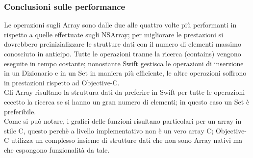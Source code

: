 \subsubsection{Conclusioni sulle performance}
Le operazioni sugli Array sono dalle due alle quattro volte più performanti in rispetto a quelle effettuate sugli NSArray; per migliorare le prestazioni si dovrebbero preinizializzare le strutture dati con il numero di elementi massimo conosciuto in anticipo. Tutte le operazioni tranne la ricerca (contains) vengono eseguite in tempo costante; nonostante Swift gestisca le operazioni di inserzione in un Dizionario e in un Set in maniera più efficiente, le altre operazioni soffrono in prestazioni rispetto ad Objective-C.\\
Gli Array risultano la struttura dati da preferire in Swift per tutte le operazioni eccetto la ricerca se si hanno un gran numero di elementi; in questo caso un Set è preferibile.\\
Come si può notare, i grafici delle funzioni risultano particolari per un array in stile C, questo perchè a livello implementativo non è un vero array C; Objective-C utilizza un complesso insieme di strutture dati che non sono Array nativi ma che espongono funzionalità da tale.
    
    
    
    


